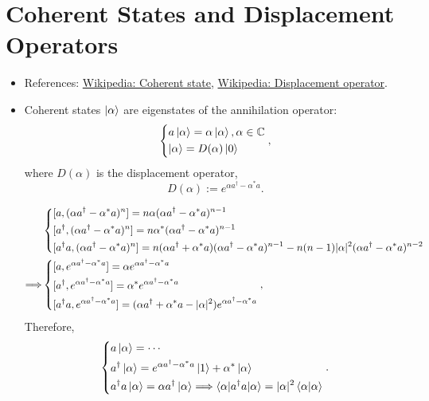 \documentclass[10pt, a4paper]{article}
\numberwithin{equation}{section}
\begin{document}
	\section{Coherent States and Displacement Operators}
	\begin{itemize}
		\item References: \href{https://en.wikipedia.org/wiki/Coherent_state}{Wikipedia: Coherent state}, \href{https://en.wikipedia.org/wiki/Displacement_operator}{Wikipedia: Displacement operator}.
		
		\item Coherent states $\ket{\alpha}$ are eigenstates of the annihilation operator:
		\begin{equation}
			\begin{dcases}
				a \ket{\alpha} = \alpha \ket{\alpha}, \alpha \in \mathbb{C} \\
				\ket{\alpha} = D(\alpha) \ket{0}
			\end{dcases},
		\end{equation}
		where $D(\alpha)$ is the displacement operator,
		\begin{equation}
			D(\alpha) := e^{\alpha a^\dag - \alpha^* a}.
		\end{equation}
		
		\begin{tcolorbox}[title=Calculation:]
			\begin{align}
				& \begin{dcases}
					[a, (\alpha a^\dag - \alpha^* a)^n] = n \alpha (\alpha a^\dag - \alpha^* a)^{n - 1} \\
					[a^\dag, (\alpha a^\dag - \alpha^* a)^n] = n \alpha^* (\alpha a^\dag - \alpha^* a)^{n - 1} \\
					[a^\dag a, (\alpha a^\dag - \alpha^* a)^n] = n (\alpha a^\dag + \alpha^* a) (\alpha a^\dag - \alpha^* a)^{n - 1} - n (n - 1) |\alpha|^2 (\alpha a^\dag - \alpha^* a)^{n - 2}
				\end{dcases} \notag \\
				\Longrightarrow & \begin{dcases}
					[a, e^{\alpha a^\dag - \alpha^* a}] = \alpha e^{\alpha a^\dag - \alpha^* a} \\
					[a^\dag, e^{\alpha a^\dag - \alpha^* a}] = \alpha^* e^{\alpha a^\dag - \alpha^* a} \\
					[a^\dag a, e^{\alpha a^\dag - \alpha^* a}] = (\alpha a^\dag + \alpha^* a - |\alpha|^2) e^{\alpha a^\dag - \alpha^* a}
				\end{dcases},
			\end{align}
			Therefore,
			\begin{equation} \label{A.4}
				\begin{dcases}
					a \ket{\alpha} = \cdots \\
					a^\dag \ket{\alpha} = e^{\alpha a^\dag - \alpha^* a} \ket{1} + \alpha^* \ket{\alpha} \\
					a^\dag a \ket{\alpha} = \alpha a^\dag \ket{\alpha} \Longrightarrow \braket{\alpha | a^\dag a | \alpha} = |\alpha|^2 \braket{\alpha | \alpha}
				\end{dcases}.
			\end{equation}
		\end{tcolorbox}
		

\end{itemize}
\end{document}
